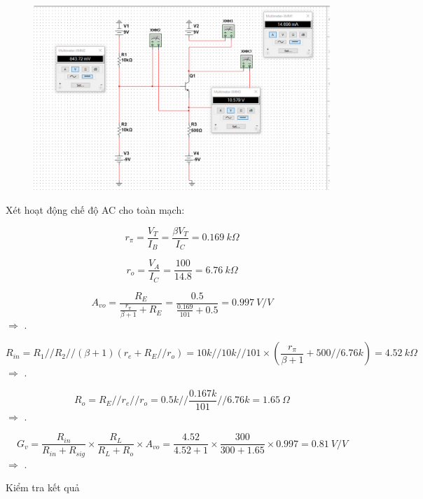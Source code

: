 \begin{itemize}[label=-]
	\begin{figure}[H]
		\centering
		\includegraphics[width=\linewidth]{./my-chapters/my-images/Question3/a_ketqua.png}
	\end{figure}
\end{itemize}


Xét hoạt động chế độ AC cho toàn mạch:

\[
r_\pi = \frac{V_T}{I_B} = \frac{\beta V_T}{I_C} = 0.169\ k\Omega
\]

\[
r_o = \frac{V_A}{I_C} = \frac{100}{14.8} = 6.76\ k\Omega
\]

\[
A_{vo} = \frac{R_E}{\frac{r_\pi}{\beta + 1} + R_E} 
= \frac{0.5}{\frac{0.169}{101} + 0.5} 
= 0.997\ V/V
\]
$\Rightarrow$ .

\[
R_{in} = R_1 // R_2 // (\beta + 1)\left(r_e + R_E // r_o\right) = 10k // 10k // 101 \times \left(\frac{r_\pi}{\beta + 1} + 500 // 6.76k\right)
= 4.52\ k\Omega
\]
$\Rightarrow$ .

\[
R_o = R_E // r_e // r_o 
= 0.5k // \frac{0.167k}{101} // 6.76k 
= 1.65\ \Omega
\]
$\Rightarrow$ .

\[
G_v = \frac{R_{in}}{R_{in} + R_{sig}} \times 
\frac{R_L}{R_L + R_o} \times A_{vo} 
= \frac{4.52}{4.52 + 1} \times 
\frac{300}{300 + 1.65} \times 0.997 
= 0.81\ V/V
\]
$\Rightarrow$ .

Kiểm tra kết quả


